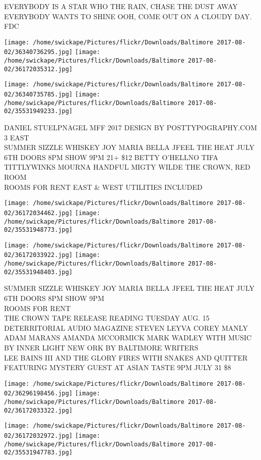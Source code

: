 \documentclass[10pt,letterpaper]{article}
\begin{document}
EVERYBODY IS A STAR WHO THE RAIN, CHASE THE DUST AWAY EVERYBODY WANTS TO SHINE OOH, COME OUT ON A CLOUDY DAY.\\
FDC
\pagebreak

\texttt{[image: /home/swickape/Pictures/flickr/Downloads/Baltimore 2017-08-02/36340736295.jpg]}
\texttt{[image: /home/swickape/Pictures/flickr/Downloads/Baltimore 2017-08-02/36172035312.jpg]}

\texttt{[image: /home/swickape/Pictures/flickr/Downloads/Baltimore 2017-08-02/36340735785.jpg]}
\texttt{[image: /home/swickape/Pictures/flickr/Downloads/Baltimore 2017-08-02/35531949233.jpg]}

DANIEL STUELPNAGEL MFF 2017 DESIGN BY POSTTYPOGRAPHY.COM\\
3 EAST\\
SUMMER SIZZLE WHISKEY JOY MARIA BELLA JFEEL THE HEAT JULY 6TH DOORS 8PM SHOW 9PM 21+ \$12 BETTY O'HELLNO TIFA TITTLYWINKS MOURNA HANDFUL MIGTY WILDE THE CROWN, RED ROOM\\
ROOMS FOR RENT EAST \& WEST UTILITIES INCLUDED
\pagebreak

\texttt{[image: /home/swickape/Pictures/flickr/Downloads/Baltimore 2017-08-02/36172034462.jpg]}
\texttt{[image: /home/swickape/Pictures/flickr/Downloads/Baltimore 2017-08-02/35531948773.jpg]}

\texttt{[image: /home/swickape/Pictures/flickr/Downloads/Baltimore 2017-08-02/36172033922.jpg]}
\texttt{[image: /home/swickape/Pictures/flickr/Downloads/Baltimore 2017-08-02/35531948403.jpg]}

SUMMER SIZZLE WHISKEY JOY MARIA BELLA JFEEL THE HEAT JULY 6TH DOORS 8PM SHOW 9PM\\
ROOMS FOR RENT\\
THE CROWN TAPE RELEASE READING TUESDAY AUG. 15 DETERRITORIAL AUDIO MAGAZINE STEVEN LEYVA COREY MANLY ADAM MARANS AMANDA MCCORMICK MARK WADLEY WITH MUSIC BY INNER LIGHT NEW ORK BY BALTIMORE WRITERS\\
LEE BAINS III AND THE GLORY FIRES WITH SNAKES AND QUITTER FEATURING MYSTERY GUEST AT ASIAN TASTE 9PM JULY 31 \$8
\pagebreak

\texttt{[image: /home/swickape/Pictures/flickr/Downloads/Baltimore 2017-08-02/36296198456.jpg]}
\texttt{[image: /home/swickape/Pictures/flickr/Downloads/Baltimore 2017-08-02/36172033322.jpg]}

\texttt{[image: /home/swickape/Pictures/flickr/Downloads/Baltimore 2017-08-02/36172032972.jpg]}
\texttt{[image: /home/swickape/Pictures/flickr/Downloads/Baltimore 2017-08-02/35531947783.jpg]}
\end{document}
